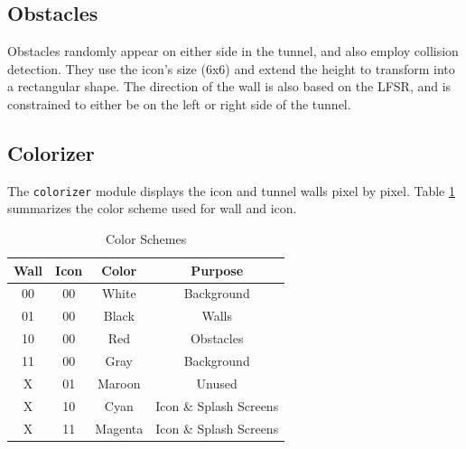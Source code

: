 \documentclass[11pt]{article}
\begin{document}
 
\subsection{Obstacles}
	Obstacles randomly appear on either side in the tunnel, and also employ collision detection.  They use the icon's size (6x6) and extend the height to transform into a rectangular shape. The direction of the wall is also based on the LFSR, and is constrained to either be on the left or right side of the tunnel.
		
\subsection{Colorizer}

The \texttt{colorizer} module displays the icon and tunnel walls pixel by pixel.  Table \ref{colorizer} summarizes the color scheme used for wall and icon.
 
	\begin {table}
	\begin {center} 
	\vspace{15pt}
	
	\begin{tabular}{||c|c|c|c||}\hline	
		\textbf{Wall}	&	\textbf{Icon}	&	\textbf{Color}	&	\textbf{Purpose}		\\\hline
		00		&	00		&	White 	&	Background 	\\\hline
		01		&	00		&	Black 	&	Walls 		\\\hline
		10		&	00		&	Red 	&	Obstacles 	\\\hline
		11		&	00		&	Gray 	&	Background	\\\hline
		X		&	01		&	Maroon	&	Unused		\\\hline
		X		&	10		&	Cyan	&	Icon \& Splash Screens	\\\hline
		X		&	11		&	Magenta	&	Icon \& Splash Screens	\\\hline	
	\end{tabular}
		\caption {Color Schemes} \label{colorizer}
	\end{center}
	\end{table} 		


%
\end{document}
